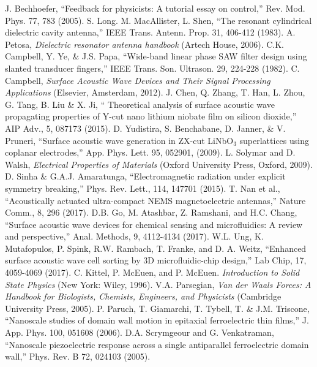 \documentclass[12pt,column,showpacs,pre,preprintnumbers,amsmath,amssymb,aps,standalone]{revtex4-2}
\begin{document}
\begin{thebibliography}{10}
	 J. Bechhoefer, \enquote {Feedback for physicists: A tutorial essay on control,} Rev. Mod. Phys. 77, 783 (2005).
	 S. Long. M. MacAllister, L. Shen, \enquote{The resonant cylindrical dielectric cavity antenna,} IEEE Trans. Antenn. Prop. 31, 406-412 (1983).
	 A. Petosa, \textit {Dielectric resonator antenna handbook} (Artech House, 2006).
	C.K. Campbell, Y. Ye, \& J.S. Papa, \enquote{Wide-band linear phase SAW filter design using slanted transducer fingers,} IEEE Trans. Son. Ultrason. 29, 224-228 (1982).
	 C. Campbell, \textit{Surface Acoustic Wave Devices and Their Signal Processing Applications} (Elsevier, Amsterdam, 2012).
	 J. Chen, Q. Zhang, T. Han, L. Zhou, G. Tang, B. Liu \& X. Ji, \enquote{ Theoretical analysis of surface acoustic wave propagating properties of Y-cut nano lithium niobate film on silicon dioxide,} AIP Adv., 5, 087173 (2015).
	 D. Yudistira, S. Benchabane, D. Janner, \& V. Pruneri, \enquote{Surface acoustic wave generation in ZX-cut LiNbO$_3$ superlattices using coplanar electrodes,} App. Phys. Lett. 95, 052901, (2009).
	 L. Solymar and D. Walsh, \textit{Electrical Properties of Materials} (Oxford University Press, Oxford, 2009). 
	D. Sinha \& G.A.J. Amaratunga, \enquote{Electromagnetic radiation under explicit symmetry breaking,} Phys. Rev. Lett., 114, 147701 (2015).
	 T. Nan et al., \enquote{Acoustically actuated ultra-compact NEMS magnetoelectric antennas,} Nature Comm., 8, 296 (2017).
	D.B. Go, M. Atashbar, Z. Ramshani, and H.C. Chang, \enquote{Surface acoustic wave devices for chemical sensing and microfluidics: A review and perspective,} Anal. Methods, 9, 4112-4134 (2017).
	 W.L. Ung, K. Mutafopulos, P. Spink, R.W. Rambach, T. Franke, and D. A. Weitz, \enquote{Enhanced surface acoustic wave cell sorting by 3D microfluidic-chip design,} Lab Chip, 17, 4059-4069 (2017).
	C. Kittel, P. McEuen, and P. McEuen. \textit{Introduction to Solid State Physics} (New York: Wiley, 1996).
	V.A. Parsegian, \textit{Van der Waals Forces: A Handbook for Biologists, Chemists, Engineers, and Physicists} (Cambridge University Press, 2005).
 P. Paruch, T. Giamarchi, T. Tybell, T. \& J.M. Triscone, \enquote{Nanoscale studies of domain wall motion in epitaxial ferroelectric thin films,} J. App. Phys. 100, 051608 (2006).
 D.A. Scrymgeour and G. Venkatraman, \enquote{Nanoscale piezoelectric response across a single antiparallel ferroelectric domain wall,} Phys. Rev. B 72, 024103 (2005).

\end{thebibliography}
\end{document}
